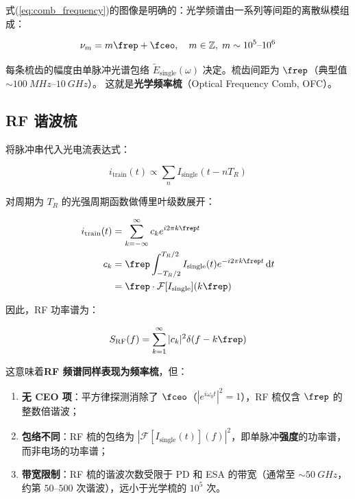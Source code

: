 \documentclass[11pt,a4paper]{article}
\newcommand{\FT}{\mathcal{F}}
\begin{document}
式(\ref{eq:comb_frequency})的图像是明确的：光学频谱由一系列等间距的离散纵模组成：

\begin{equation}\label{eq:optical_comb}
\nu_m = m \frep + \fceo, \quad m \in \mathbb{Z},\; m \sim 10^5\text{--}10^6
\end{equation}

每条梳齿的幅度由单脉冲光谱包络 $\tilde{E}_{\text{single}}(\omega)$ 决定。梳齿间距为 $\frep$（典型值 $\sim\SI{100}{MHz}$--$\SI{10}{GHz}$）。
这就是\textbf{光学频率梳}（Optical Frequency Comb, OFC）\cite{Udem2002,Jones2000}。

\subsection{RF 谐波梳}

将脉冲串代入光电流表达式：

\begin{equation}\label{eq:pd_train}
i_{\text{train}}(t) \propto \sum_{n} I_{\text{single}}(t - n T_R)
\end{equation}

对周期为 $T_R$ 的光强周期函数做傅里叶级数展开：

\begin{equation}\label{eq:rf_comb}
\begin{aligned}
i_{\text{train}}(t) &= \sum_{k=-\infty}^{\infty} c_k e^{i 2\pi k \frep t} \\
c_k &= \frep \int_{-T_R/2}^{T_R/2} I_{\text{single}}(t) e^{-i 2\pi k \frep t} \dd{t} \\
&= \frep \cdot \FT[I_{\text{single}}](k \frep)
\end{aligned}
\end{equation}

因此，RF 功率谱为：

\begin{equation}\label{eq:rf_comb_spectrum}
S_{\text{RF}}(f) = \sum_{k=1}^{\infty} |c_k|^2 \delta(f - k \frep)
\end{equation}

这意味着\textbf{RF 频谱同样表现为频率梳}，但：
\begin{enumerate}[label=(\arabic*)]
    \item \textbf{无 CEO 项}：平方律探测消除了 $\fceo$（$|e^{i\omega_0 t}|^2 = 1$），RF 梳仅含 $\frep$ 的整数倍谐波；
    \item \textbf{包络不同}：RF 梳的包络为 $|\FT[I_{\text{single}}(t)](f)|^2$，即单脉冲\textbf{强度}的功率谱，而非电场的功率谱；
    \item \textbf{带宽限制}：RF 梳的谐波次数受限于 PD 和 ESA 的带宽（通常至 $\sim\SI{50}{GHz}$，约第 $50$--$500$ 次谐波），远小于光学梳的 $10^5$ 次。
\end{enumerate}
\end{document}
